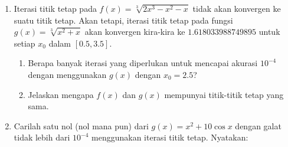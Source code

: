 \begin{enumerate}
\begin{enumerate}
\item Sebagai persiapan untuk mencari akar $g(x)$ dengan iterasi titik
tetap, salah satu cara memanipulasi persamaan $x^{4}+2x^{2}-x-3=0$
adalah dengan menambahkan $x$ pada kedua ruas. Hasilnya
\[
x=x^{4}+2x^{2}-3
\]
Buatlah grafik yang sesuai untuk menentukan apakah iterasi fungsi
$f(x)=x^{4}+2x^{2}-3$ akan menemukan akar dalam $[-1,0]$. Bagaimana
dengan akar dalam $[1,2]$? Jelaskan bagaimana Anda memperoleh kesimpulan
tersebut.
\item \label{root1}Manipulasilah persamaan $x^{4}+2x^{2}-x-3=0$ sedemikian
rupa sehingga iterasi titik tetap berhasil menemukan akar dalam $[-1,0]$.
Gambarlah grafik yang menunjukkan bahwa metode Anda akan berhasil.
\item \label{root2}Apakah manipulasi yang sama memungkinkan Anda menemukan
akar dalam $[1,2]$? Jika tidak, carilah manipulasi lain yang dapat
melakukannya. Sekali lagi, tampilkan grafik yang menunjukkan bahwa
metode Anda akan berhasil.
\item Gunakan metode Anda dari bagian \ref{root1} dan \ref{root2} untuk
mencari kedua akar hingga 3 tempat desimal.
\end{enumerate}
\item \label{exc:fixedpt-14}Iterasi titik tetap pada $f(x)=\sqrt[3]{2x^{3}-x^{2}-x}$
tidak akan konvergen ke suatu titik tetap. Akan tetapi, iterasi titik
tetap pada fungsi $g(x)=\sqrt[3]{x^{2}+x}$ akan konvergen kira-kira
ke $1.618033988749895$ untuk setiap $x_{0}$ dalam $[0.5,3.5]$. \hasananswer 

\begin{enumerate}
\item Berapa banyak iterasi yang diperlukan untuk mencapai akurasi $10^{-4}$
dengan menggunakan $g(x)$ dengan $x_{0}=2.5$?
\item Jelaskan mengapa $f(x)$ dan $g(x)$ mempunyai titik-titik tetap yang
sama.
\end{enumerate}
\item Carilah satu nol (nol mana pun) dari $g(x)=x^{2}+10\cos x$ dengan
galat tidak lebih dari $10^{-4}$ menggunakan iterasi titik tetap.
Nyatakan:


\end{enumerate}
